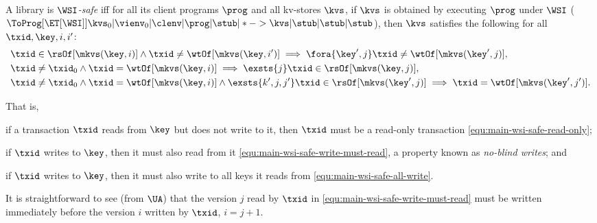 

\SpaceAboveDef
\begin{definition}
\label{def:main-body-wsi-safe}
A library is \emph{\(\WSI\)-safe}
iff for all its client programs $\prog$ and all kv-stores \( \kvs \), 
if $\kvs$ is  obtained by executing \( \prog \) under $\WSI$ 
(\ie \( \ToProg[{\ET[\WSI]}]{\kvs_0 | \vienv_0 | \clenv | \prog | \stub | * -> \kvs | \stub | \stub | \stub }\)),
then $\kvs$ satisfies the following for all $\txid, \key, i,i'$:
%
\begin{align}
     & \txid \in \rsOf[\mkvs(\key,i)] \land \txid \neq \wtOf[\mkvs(\key,i')]  \implies \fora{\key',j} \txid \neq \wtOf[\mkvs(\key',j)] , \label{equ:main-wsi-safe-read-only} \\
     & \txid \neq \txid_0 \land \txid = \wtOf[\mkvs(\key,i)] \implies \exsts{j} \txid \in \rsOf[\mkvs(\key,j)] , \label{equ:main-wsi-safe-write-must-read} \\
     & \txid \neq \txid_0 \land \txid = \wtOf[\mkvs(\key,i)] \land \exsts{k',j,j'} \txid \in \rsOf[\mkvs(\key',j)] \implies \txid = \wtOf[\mkvs(\key',j')] . \label{equ:main-wsi-safe-all-write}
\end{align}
%
\end{definition}


That is, %
\begin{enumerate*} 
\item if a transaction $\txid$ reads from $\key$ but does not write to it, 
then $\txid$ must be a read-only transaction \eqref{equ:main-wsi-safe-read-only}; 
\item if \( \txid \) writes to $\key$, then it must also read from it \eqref{equ:main-wsi-safe-write-must-read}, a property known as \emph{no-blind writes}; and
\item if \( \txid \) writes to $\key$, then it must also write to all keys it reads from \eqref{equ:main-wsi-safe-all-write}.
\end{enumerate*}
It is straightforward to see (from $\UA$) that the version $j$ read by \(
\txid \) in \eqref{equ:main-wsi-safe-write-must-read} must be written
immediately before the version $i$ written by \( \txid \), \ie \( i
= j {+} 1 \). 

